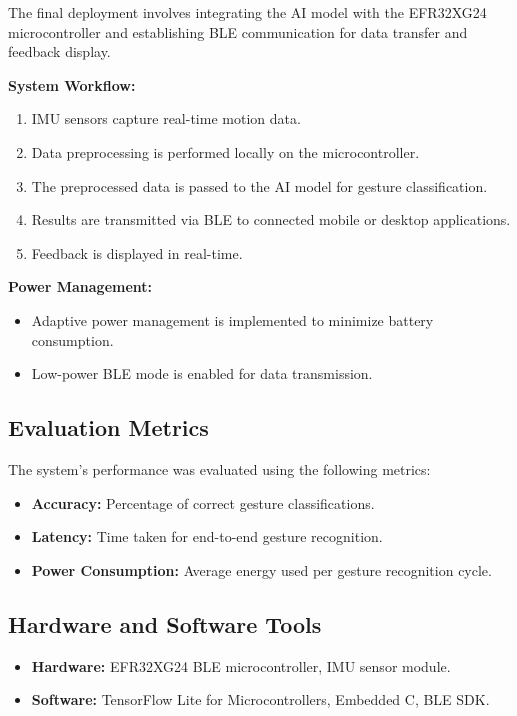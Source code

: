 \documentclass[
  9pt,
  letterpaper,
  abstract,
  titlepage]{scrbook}
\begin{document}
The final deployment involves integrating the AI model with the
EFR32XG24 microcontroller and establishing BLE communication for data
transfer and feedback display.

\textbf{System Workflow:}

\begin{enumerate}
\def\labelenumi{\arabic{enumi}.}
\item
  IMU sensors capture real-time motion data.
\item
  Data preprocessing is performed locally on the microcontroller.
\item
  The preprocessed data is passed to the AI model for gesture
  classification.
\item
  Results are transmitted via BLE to connected mobile or desktop
  applications.
\item
  Feedback is displayed in real-time.
\end{enumerate}

\textbf{Power Management:}

\begin{itemize}
\item
  Adaptive power management is implemented to minimize battery
  consumption.
\item
  Low-power BLE mode is enabled for data transmission.
\end{itemize}

\subsection{Evaluation Metrics}\label{evaluation-metrics}

The system's performance was evaluated using the following metrics:

\begin{itemize}
\item
  \textbf{Accuracy:} Percentage of correct gesture classifications.
\item
  \textbf{Latency:} Time taken for end-to-end gesture recognition.
\item
  \textbf{Power Consumption:} Average energy used per gesture
  recognition cycle.
\end{itemize}

\subsection{Hardware and Software
Tools}\label{hardware-and-software-tools}

\begin{itemize}
\item
  \textbf{Hardware:} EFR32XG24 BLE microcontroller, IMU sensor module.
\item
  \textbf{Software:} TensorFlow Lite for Microcontrollers, Embedded C,
  BLE SDK.
\end{itemize}
\end{document}
